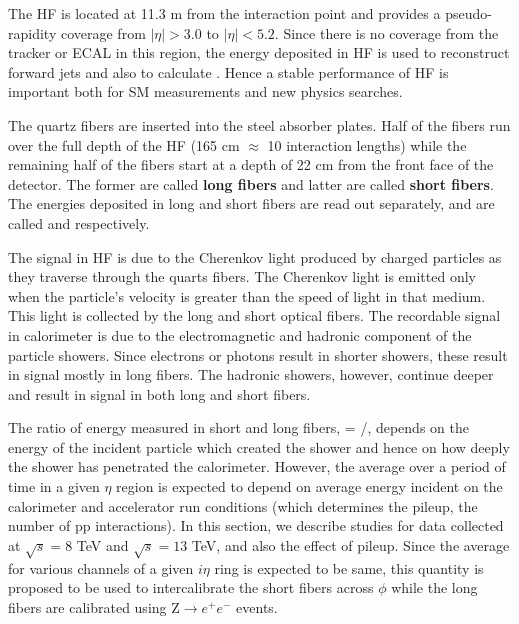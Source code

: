 The HF is located at 11.3 m from the interaction point and provides a
pseudo-rapidity coverage from $|\eta|>3.0$ to $|\eta|<5.2$. Since
there is no coverage from the tracker or ECAL in this region, the energy deposited in HF
is used to reconstruct forward jets and also to calculate
\ptmiss. Hence a stable performance of HF is important both for SM
measurements and new physics searches.

The quartz fibers are inserted into the steel absorber plates. Half
of the fibers run over the full depth of the HF (165 cm $\approx$ 10
interaction lengths) while the remaining half of the fibers start at a
depth of 22 cm from the front face of the detector. The former
are called {\bf long fibers} and latter are called {\bf short
  fibers}. The energies deposited in long and short fibers are read
out separately, and are called {\elong} and {\eshort} respectively.

The signal in HF is due to the Cherenkov light produced by charged particles as they traverse through the quarts fibers. The
Cherenkov light is emitted only when the particle's velocity is greater than the speed of light in that medium. This light is collected by 
the long and short optical fibers. The recordable signal in calorimeter is due to the electromagnetic and hadronic component of the 
particle showers. Since electrons or photons result in shorter showers, these result in signal mostly
in long fibers. The hadronic showers, however, continue deeper and
result in signal in both long and short fibers.

The ratio of energy measured in short and long fibers,
\ratiosl = \eshort/\elong, depends on the energy of the incident
particle which created the shower and hence on how deeply the shower
has penetrated the calorimeter. However, the average \ratiosl
over a period of time in a given $\eta$ region is expected
to depend on average energy incident on the calorimeter and
accelerator run conditions (which determines the pileup, the number of pp interactions). In this
section, we describe studies \ratiosl for data collected at $\sqrt{s} = 8$
TeV and  $\sqrt{s} = 13$ TeV, and also the effect of pileup. 
Since the average \ratiosl for various channels of a
given $i\eta$ ring is expected to be same, this quantity is proposed to
be used to intercalibrate the short fibers across $\phi$
while the long fibers are calibrated using Z$\rightarrow e^+e^-$ events.

